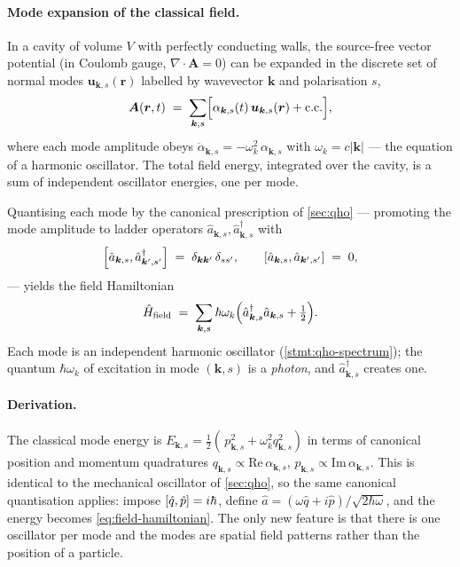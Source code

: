 \paragraph{Mode expansion of the classical field.}
In a cavity of volume $V$ with perfectly conducting walls, the
source-free vector potential (in Coulomb gauge, $\nabla\cdot\bm A=0$)
can be expanded in the discrete set of normal modes $\bm u_{\bm k,s}(\bm r)$
labelled by wavevector $\bm k$ and polarisation $s$,
\begin{equation}
\label{eq:mode-expansion}
\bm A(\bm r,t) \;=\; \sum_{\bm k,s}\Bigl[
\alpha_{\bm k,s}(t)\,\bm u_{\bm k,s}(\bm r) + \text{c.c.}\Bigr],
\end{equation}
where each mode amplitude obeys $\ddot\alpha_{\bm k,s}=-\omega_k^2\,\alpha_{\bm k,s}$
with $\omega_k=c|\bm k|$ --- the equation of a harmonic oscillator.
The total field energy, integrated over the cavity, is a sum of
independent oscillator energies, one per mode.

\begin{statement}
\label{stmt:field-oscillators}
Quantising each mode by the canonical prescription of
\cref{sec:qho} --- promoting the mode amplitude to ladder
operators $\hat a_{\bm k,s},\hat a_{\bm k,s}^\dagger$ with
\begin{equation}
\label{eq:field-commutator}
\comm{\hat a_{\bm k,s}}{\hat a_{\bm k',s'}^\dagger} \;=\; \delta_{\bm k\bm k'}\,\delta_{ss'},
\qquad
\comm{\hat a_{\bm k,s}}{\hat a_{\bm k',s'}} \;=\; 0,
\end{equation}
--- yields the field Hamiltonian
\begin{equation}
\label{eq:field-hamiltonian}
\hat{H}_{\rm field} \;=\; \sum_{\bm k,s}\hbar\omega_k
\Bigl(\hat a_{\bm k,s}^\dagger\hat a_{\bm k,s} + \tfrac12\Bigr).
\end{equation}
Each mode is an independent harmonic oscillator (\cref{stmt:qho-spectrum});
the quantum $\hbar\omega_k$ of excitation in mode $(\bm k,s)$ is a
\emph{photon}, and $\hat a_{\bm k,s}^\dagger$ creates one.
\end{statement}

\paragraph{Derivation.}
The classical mode energy is $E_{\bm k,s}=\tfrac12(\,p_{\bm k,s}^2+\omega_k^2 q_{\bm k,s}^2)$
in terms of canonical position and momentum quadratures
$q_{\bm k,s}\propto\mathrm{Re}\,\alpha_{\bm k,s}$,
$p_{\bm k,s}\propto\mathrm{Im}\,\alpha_{\bm k,s}$. This is identical
to the mechanical oscillator of \cref{sec:qho}, so the same
canonical quantisation applies: impose $\comm{\hat q}{\hat p}=i\hbar$,
define $\hat a=(\omega\hat q+i\hat p)/\sqrt{2\hbar\omega}$, and the
energy becomes \cref{eq:field-hamiltonian}. The only new feature is
that there is one oscillator per mode and the modes are spatial
field patterns rather than the position of a particle.

